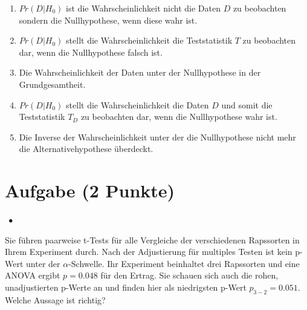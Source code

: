 \documentclass[a4paper, 9pt]{scrartcl}\usepackage[]{graphicx}\usepackage[]{xcolor}
\begin{document}
{\begin{enumerate}
\item [\textbf{A} \msquare] $Pr(D|H_0)$ ist die Wahrscheinlichkeit nicht die Daten $D$ zu beobachten sondern die Nullhypothese, wenn diese wahr ist.
\item [\textbf{B} \msquare] $Pr(D|H_0)$ stellt die Wahrscheinlichkeit die Teststatistik $T$ zu beobachten dar, wenn die Nullhypothese falsch ist.
\item [\textbf{C} \msquare] Die Wahrscheinlichkeit der Daten unter der Nullhypothese in der Grundgesamtheit.
\item [\textbf{D} \msquare] $Pr(D|H_0)$ stellt die Wahrscheinlichkeit die Daten $D$ und somit die Teststatistik $T_D$ zu beobachten dar, wenn die Nullhypothese wahr ist.
\item [\textbf{E} \msquare] Die Inverse der Wahrscheinlichkeit unter der die Nullhypothese nicht mehr die Alternativehypothese überdeckt.
\end{enumerate}

\section{Aufgabe \hfill (2 Punkte)}

\ifcollection
\begin{flushright}
\tiny\vspace{-2Ex}
\textbf{\examinhaltstart}
\exammodulestatversuch $\;\bullet$
\exammodulebiostat
\vspace{-1Ex}
\end{flushright}
\fi




Sie führen paarweise t-Tests für alle Vergleiche der verschiedenen Rapssorten in Ihrem Experiment durch. Nach der Adjustierung für multiples Testen ist kein p-Wert unter der $\alpha$-Schwelle. Ihr Experiment beinhaltet drei Rapssorten und eine ANOVA ergibt $p = 0.048$ für den Ertrag. Sie schauen sich auch die rohen, unadjustierten p-Werte an und finden hier als niedrigsten p-Wert $p_{3-2} = 0.051$. Welche Aussage ist richtig?




}
\end{document}
